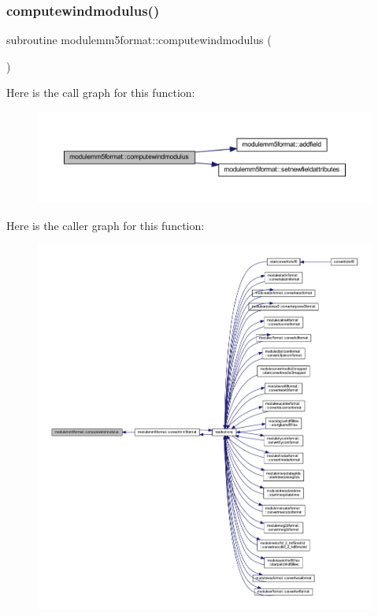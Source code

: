 \subsubsection{\texorpdfstring{computewindmodulus()}{computewindmodulus()}}
{\footnotesize\ttfamily subroutine modulemm5format\+::computewindmodulus (\begin{DoxyParamCaption}{ }\end{DoxyParamCaption})\hspace{0.3cm}{\ttfamily [private]}}

Here is the call graph for this function\+:\nopagebreak
\begin{figure}[H]
\begin{center}
\leavevmode
\includegraphics[width=350pt]{namespacemodulemm5format_a9b2d602cf6fbd9095b5738722bd3a13c_cgraph}
\end{center}
\end{figure}
Here is the caller graph for this function\+:\nopagebreak
\begin{figure}[H]
\begin{center}
\leavevmode
\includegraphics[width=350pt]{namespacemodulemm5format_a9b2d602cf6fbd9095b5738722bd3a13c_icgraph}
\end{center}
\end{figure}
\mbox{\label{namespacemodulemm5format_af869ebd4b03375bc5013329b9bce52d7}} 
